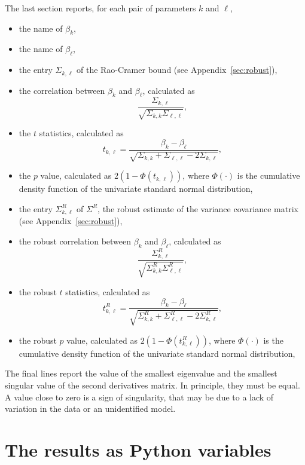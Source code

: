 \documentclass[12pt,a4paper]{article}
\begin{document}
The last section reports, for each pair of parameters $k$ and
$\ell$,
\begin{itemize}
\item the name of $\beta_k$,
\item the name of $\beta_\ell$,
\item the entry $\Sigma_{k,\ell}$ of the 
         Rao-Cramer bound (see Appendix~\ref{sec:robust}),
\item the correlation between $\beta_k$ and $\beta_\ell$, calculated as
\begin{equation}
\frac{\Sigma_{k,\ell}}{\sqrt{\Sigma_{k,k}\Sigma_{\ell,\ell}}},
\end{equation}
\item the $t$ statistics, calculated as
\begin{equation}
t_{k,\ell}= \frac{\beta_k - \beta_\ell}{\sqrt{\Sigma_{k,k} + \Sigma_{\ell,\ell} - 2 \Sigma_{k,\ell}}},
\end{equation}
  \item the $p$ value, calculated as $2 (1 - \Phi(t_{k,\ell}))$,
where $\Phi(\cdot)$ is the cumulative density function of the
univariate standard normal distribution,
\item the entry $\Sigma^R_{k,\ell}$ of $\Sigma^R$, the robust estimate of the variance covariance matrix (see Appendix~\ref{sec:robust}),
\item the robust correlation between $\beta_k$ and $\beta_\ell$, calculated as
\begin{equation}
\frac{\Sigma^R_{k,\ell}}{\sqrt{\Sigma^R_{k,k}\Sigma^R_{\ell,\ell}}},
\end{equation}
\item the robust $t$ statistics, calculated as
\begin{equation}
t^R_{k,\ell}=\frac{\beta_k - \beta_\ell}{\sqrt{\Sigma^R_{k,k} + \Sigma^R_{\ell,\ell}
    - 2 \Sigma^R_{k,\ell}}},
\end{equation}
     \item the robust $p$ value, calculated as $2 (1 - \Phi(t^R_{k,\ell}))$,
where $\Phi(\cdot)$ is the cumulative density function of the
univariate standard normal distribution,
\end{itemize}
The final lines report the value of the smallest eigenvalue and the
smallest singular value of the
second derivatives matrix. In principle, they must be equal.  A value close to zero is a sign of
singularity, that may be due to a lack of variation in the data or
an unidentified model.


\section{The results as Python variables}
\end{document}
